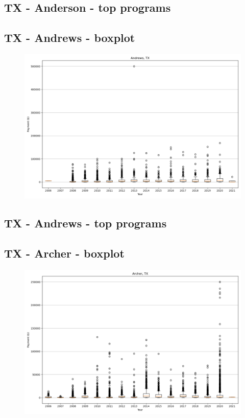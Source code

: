 \subsection*{TX - Anderson - top programs}

\newpage
\subsection*{TX - Andrews - boxplot}
\begin{figure}[h]
\centering
\includegraphics[width=7in]{../output/boxplots/counties/Andrews-TX_boxplot.png}
\end{figure}


\subsection*{TX - Andrews - top programs}

\newpage
\subsection*{TX - Archer - boxplot}
\begin{figure}[h]
\centering
\includegraphics[width=7in]{../output/boxplots/counties/Archer-TX_boxplot.png}
\end{figure}


